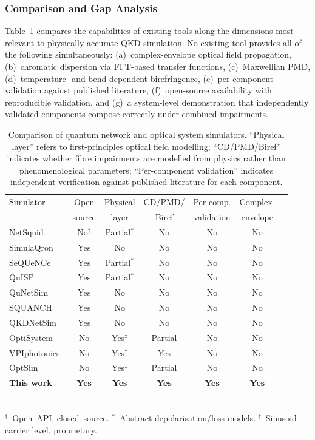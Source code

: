 \documentclass[11pt,a4paper]{article}
\begin{document}
\subsubsection{Comparison and Gap Analysis}

Table~\ref{tab:comparison} compares the capabilities of existing tools
along the dimensions most relevant to physically accurate QKD simulation.
No existing tool provides all of the following simultaneously:
(a)~complex-envelope optical field propagation,
(b)~chromatic dispersion via FFT-based transfer functions,
(c)~Maxwellian PMD,
(d)~temperature- and bend-dependent birefringence,
(e)~per-component validation against published literature,
(f)~open-source availability with reproducible validation, and
(g)~a system-level demonstration that independently validated components
compose correctly under combined impairments.

\begin{table}[!ht]
  \caption{Comparison of quantum network and optical system simulators.
  ``Physical layer'' refers to first-principles optical field modelling;
  ``CD/PMD/Biref'' indicates whether fibre impairments are modelled
  from physics rather than phenomenological parameters;
  ``Per-component validation'' indicates independent verification
  against published literature for each component.}
  \label{tab:comparison}
  \centering
  \small
  \begin{tabular}{l c c c c c c}
    \toprule
    Simulator & Open & Physical & CD/PMD/ & Per-comp. & Complex- \\
    & source & layer & Biref & validation & envelope \\
    \midrule
    NetSquid~\cite{netSquid}       & No$^\dagger$ & Partial$^*$ & No  & No  & No \\
    SimulaQron~\cite{simulaqron}   & Yes & No  & No  & No  & No \\
    SeQUeNCe~\cite{sequence}       & Yes & Partial$^*$ & No  & No  & No \\
    QuISP~\cite{quisp}             & Yes & Partial$^*$ & No  & No  & No \\
    QuNetSim~\cite{qunetsim}       & Yes & No  & No  & No  & No \\
    SQUANCH~\cite{squanch}         & Yes & No  & No  & No  & No \\
    QKDNetSim~\cite{qkdnetsim}     & Yes & No  & No  & No  & No \\
    OptiSystem~\cite{optisystem}   & No  & Yes$^\ddagger$ & Partial & No & No \\
    VPIphotonics~\cite{vpiphotonics} & No & Yes$^\ddagger$ & Yes & No & No \\
    OptSim~\cite{optsim}           & No  & Yes$^\ddagger$ & Partial & No & No \\
    \textbf{This work}             & \textbf{Yes} & \textbf{Yes} & \textbf{Yes} & \textbf{Yes} & \textbf{Yes} \\
    \bottomrule
  \end{tabular}
  \\[4pt]
  {\footnotesize $^\dagger$~Open~API, closed~source. \quad
  $^*$~Abstract depolarisation/loss models. \quad
  $^\ddagger$~Sinusoid-carrier level, proprietary.}
\end{table}
\end{document}
